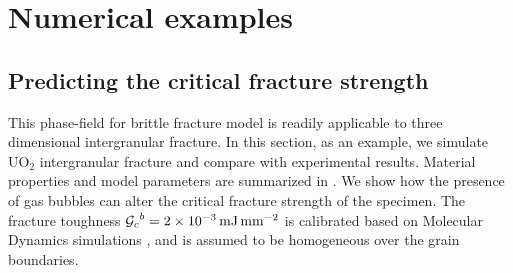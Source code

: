 \section{Numerical examples}
\label{section: brittle/examples}

\subsection{Predicting the critical fracture strength}

This phase-field for brittle fracture model is readily applicable to three dimensional intergranular fracture. In this section, as an example, we simulate UO$_2$ intergranular fracture and compare with experimental results. Material properties and model parameters are summarized in . We show how the presence of gas bubbles can alter the critical fracture strength of the specimen. The fracture toughness ${\mathcal{G}_c}^b = \SI{2e-3}{\milli\joule\per\square\milli\meter}$ is calibrated based on Molecular Dynamics simulations \cite{pritam_2016}, and is assumed to be homogeneous over the grain boundaries.

